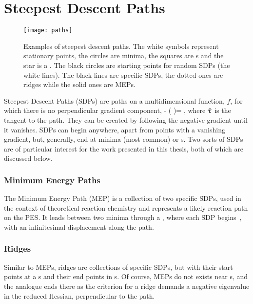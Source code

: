 \section{Steepest Descent Paths}
\label{sec:sdps}
\begin{figure}[h]
  \begin{center}
    \texttt{[image: paths]}
    \parbox{0.85\linewidth}{
      \caption{Examples of steepest descent paths.
The white symbols represent stationary points, the circles are minima, the squares are s and the star is a .
The black circles are starting points for random SDPs (the white lines).
The black lines are specific SDPs, the dotted ones are ridges while the solid ones are MEPs.
      }
      \label{fig:paths}
    }
  \end{center}
\end{figure}

Steepest Descent Paths (SDPs) are paths on a multidimensional function, $f$, for which there is no perpendicular gradient component,
\nabla {} - (\nabla {} \cdot \uvt)\uvt = ,
\eeq
where $\hat{{\mathrm{\mathbf{\bm{\uptau}}}}}$ is the tangent to the path.
They can be created by following the negative gradient until it vanishes.
SDPs can begin anywhere, apart from points with a vanishing gradient, but, generally, end at minima (most common) or \sap{}s.
Two sorts of SDPs are of particular interest for the work presented in this thesis, both of which are discussed below.

\subsubsection{Minimum Energy Paths}
The Minimum Energy Path (MEP) is a collection of two specific SDPs, used in the context of theoretical reaction chemistry and represents a likely reaction path on the PES.
It leads between two minima through a , where each SDP begins~\cite{neb-polemic-henkelman1}, with an infinitesimal displacement along the path.

\subsubsection{Ridges}
Similar to MEPs, ridges are collections of specific SDPs, but with their start points at a s and their end points in s.
Of course, MEPs do not exists near s, and the analogue ends there as the criterion for a ridge demands a negative eigenvalue in the reduced Hessian, perpendicular to the path.

